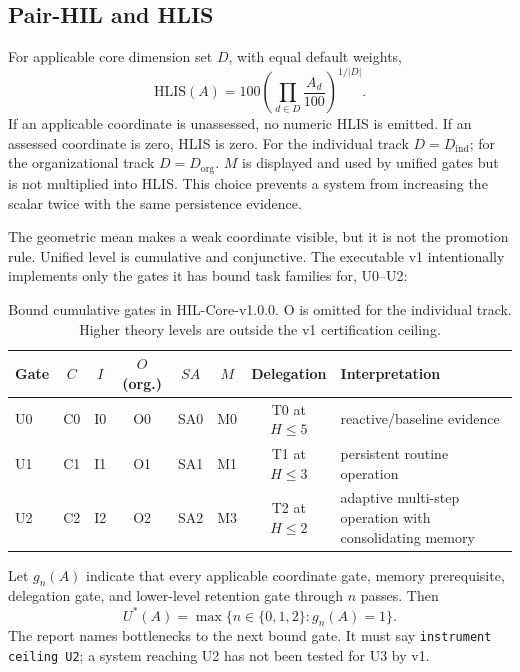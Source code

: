 \documentclass[11pt]{article}
\theoremstyle{definition}
\newcommand{\HLIS}{\ensuremath{\mathrm{HLIS}}}
\begin{document}
\subsection{Pair-HIL and HLIS}

For applicable core dimension set $D$, with equal default weights,
\begin{equation}
\HLIS(A)=100\left(\prod_{d\in D}\frac{A_d}{100}\right)^{1/|D|}.
\label{eq:hlis}
\end{equation}
If an applicable coordinate is unassessed, no numeric HLIS is emitted. If an assessed coordinate is zero, HLIS is zero. For the individual track $D=D_{\mathrm{ind}}$; for the organizational track $D=D_{\mathrm{org}}$. $M$ is displayed and used by unified gates but is not multiplied into HLIS. This choice prevents a system from increasing the scalar twice with the same persistence evidence.

The geometric mean makes a weak coordinate visible, but it is not the promotion rule. Unified level is cumulative and conjunctive. The executable v1 intentionally implements only the gates it has bound task families for, U0--U2:

\begin{table}[H]
\centering\small
\begin{tabularx}{\textwidth}{@{}lccccccY@{}}
\toprule
Gate & $C$ & $I$ & $O$ (org.) & $SA$ & $M$ & Delegation & Interpretation \\
\midrule
U0 & C0 & I0 & O0 & SA0 & M0 & T0 at $H\le5$ & reactive/baseline evidence \\
U1 & C1 & I1 & O1 & SA1 & M1 & T1 at $H\le3$ & persistent routine operation \\
U2 & C2 & I2 & O2 & SA2 & M3 & T2 at $H\le2$ & adaptive multi-step operation with consolidating memory \\
\bottomrule
\end{tabularx}
\caption{Bound cumulative gates in HIL-Core-v1.0.0. O is omitted for the individual track. Higher theory levels are outside the v1 certification ceiling.}
\label{tab:gates}
\end{table}

Let $g_n(A)$ indicate that every applicable coordinate gate, memory prerequisite, delegation gate, and lower-level retention gate through $n$ passes. Then
\begin{equation}
U^*(A)=\max\{n\in\{0,1,2\}:g_n(A)=1\}.
\end{equation}
The report names bottlenecks to the next bound gate. It must say \texttt{instrument ceiling U2}; a system reaching U2 has not been tested for U3 by v1.
\end{document}
